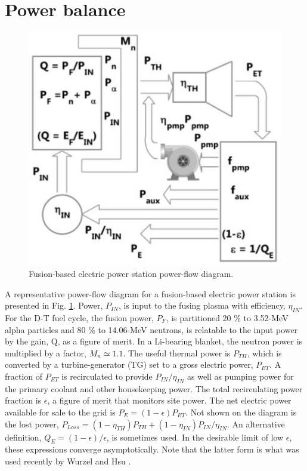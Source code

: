\section{Power balance} 
\begin{figure}[h!] 
\centering 
\includegraphics[scale=0.6]{StandardFigures/power.eps} 
\caption{Fusion-based electric power station power-flow diagram.}
\label{fig:pwr} 
\end{figure} 
A representative power-flow diagram for a fusion-based electric power station is presented in Fig. \ref{fig:pwr}. Power, $P_{IN}$, is input to the fusing plasma with efficiency, $\eta_{IN}$. For the D-T fuel cycle, the fusion power, $P_{F}$, is partitioned 20 \% to 3.52-MeV alpha particles and 80 \% to 14.06-MeV neutrons, is relatable to the input power by the gain, Q, as a figure of merit. In a Li-bearing blanket, the neutron power is multiplied by a factor, $M_{n} \simeq 1.1$.  The useful thermal power is $P_{TH}$, which is converted by a turbine-generator (TG) set to a gross electric power, $P_{ET}$.  A fraction of $P_{ET}$ is recirculated to provide $P_{IN}/\eta_{IN}$ as well as pumping power for the primary coolant and other housekeeping power.  The total recirculating power fraction is $\epsilon$, a figure of merit that monitors site power. The net electric power available for sale to the grid is $P_{E} = (1 - \epsilon)P_{ET}$. Not shown on the diagram is the lost power, $P_{Loss} = (1 - \eta_{TH})P_{TH} + (1 - \eta_{IN})P_{IN}/\eta_{IN}$. An alternative definition, $Q_{E} = (1 - \epsilon)/\epsilon$, is sometimes used.  In the desirable limit of low $\epsilon$, these expressions converge asymptotically. Note that the latter form is what was used recently by Wurzel and Hsu \cite{Wurzel2022}. \\

